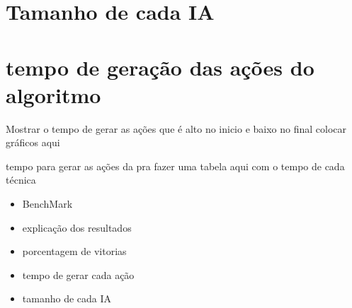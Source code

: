\section{Tamanho de cada IA}



\section{tempo de geração das ações do algoritmo}

Mostrar o tempo de gerar as ações que é alto no inicio e baixo no final
colocar gráficos aqui 


tempo para gerar as ações
da pra fazer uma tabela aqui com o tempo de cada técnica



\begin{itemize}
	\item BenchMark
	\item explicação dos resultados
	\item porcentagem de vitorias
	\item tempo de gerar cada ação
	\item tamanho de cada IA	
\end{itemize}

